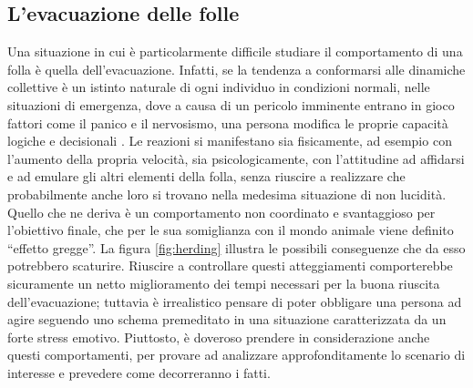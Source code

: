 \subsection{L'evacuazione delle folle}
Una situazione in cui è particolarmente difficile studiare il comportamento di una folla è quella dell'evacuazione. Infatti, se la tendenza a conformarsi alle dinamiche collettive è un istinto naturale di ogni individuo in condizioni normali, nelle situazioni di emergenza, dove a causa di un pericolo imminente entrano in gioco fattori come il panico e il nervosismo, una persona modifica le proprie capacità logiche e decisionali \cite{Helbing2011}. \newline 
Le reazioni si manifestano sia fisicamente, ad esempio con l'aumento della propria velocità, sia psicologicamente, con l'attitudine ad affidarsi e ad emulare gli altri elementi della folla, senza riuscire a realizzare che probabilmente anche loro si trovano nella medesima situazione di non lucidità. Quello che ne deriva è un comportamento non coordinato e svantaggioso per l'obiettivo finale, che per le sua somiglianza con il mondo animale viene definito \enquote{effetto gregge}. La figura \ref{fig:herding} illustra le possibili conseguenze che da esso  potrebbero scaturire. \newline
Riuscire a controllare questi atteggiamenti comporterebbe sicuramente un netto miglioramento dei tempi necessari per la buona riuscita dell'evacuazione; tuttavia è irrealistico pensare di poter obbligare una persona ad agire seguendo uno schema premeditato in una situazione caratterizzata da un forte stress emotivo. \newline
Piuttosto, è doveroso prendere in considerazione anche questi comportamenti, per provare ad analizzare approfonditamente lo scenario di interesse e prevedere come decorreranno i fatti.


